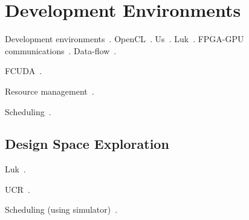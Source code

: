 \section{Development Environments}
\label{sec:dev}

Development environments~\cite{mlk12}.
OpenCL~\cite{Ahmed11}.
Us~\cite{blc17,cft+10,ctg+07,ftb+06,wcc12,wcc13}.
Luk~\cite{ttpl11}.
FPGA-GPU communications~\cite{brf14,tdm13,tdmp15}.
Data-flow~\cite{szb+12}.

FCUDA~\cite{pgs+13}.

Resource management~\cite{bdm+13}.

Scheduling~\cite{lk17,lp17}.

\subsection{Design Space Exploration}

Luk~\cite{ll12,ll11,slkk13}.

UCR~\cite{bbg13}.

Scheduling (using simulator)~\cite{blby11}.
